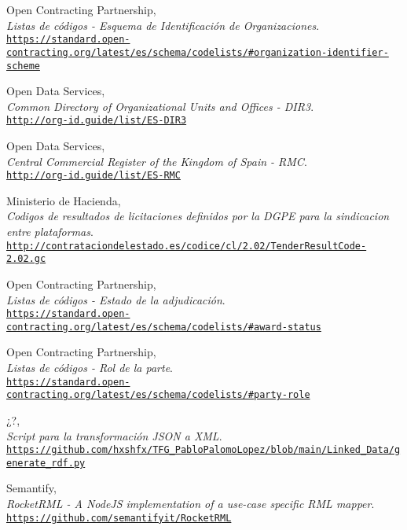 \begin{thebibliography}{X}
            Open Contracting Partnership,
            \\ \textit{Listas de códigos - Esquema de Identificación de Organizaciones}.
            \\ \texttt{\url{https://standard.open-contracting.org/latest/es/schema/codelists/\#organization-identifier-scheme}}
            
            Open Data Services,
            \\ \textit{Common Directory of Organizational Units and Offices - DIR3}.
            \\ \texttt{\url{http://org-id.guide/list/ES-DIR3}}
            
            Open Data Services,
            \\ \textit{Central Commercial Register of the Kingdom of Spain - RMC}.
            \\ \texttt{\url{http://org-id.guide/list/ES-RMC}}
        
            Ministerio de Hacienda,
            \\ \textit{Codigos de resultados de licitaciones definidos por la DGPE para la sindicacion entre plataformas}.
            \\ \texttt{\url{http://contrataciondelestado.es/codice/cl/2.02/TenderResultCode-2.02.gc}}
            
            Open Contracting Partnership,
            \\ \textit{Listas de códigos - Estado de la adjudicación}.
            \\ \texttt{\url{https://standard.open-contracting.org/latest/es/schema/codelists/\#award-status}}
            
            Open Contracting Partnership,
            \\ \textit{Listas de códigos - Rol de la parte}.
            \\ \texttt{\url{https://standard.open-contracting.org/latest/es/schema/codelists/\#party-role}}
        
            ¿?,
            \\ \textit{Script para la transformación JSON a XML}.
            \\ \texttt{\url{https://github.com/hxshfx/TFG_PabloPalomoLopez/blob/main/Linked_Data/generate_rdf.py}}
        
            Semantify,
            \\ \textit{RocketRML - A NodeJS implementation of a use-case specific RML mapper}.
            \\ \texttt{\url{https://github.com/semantifyit/RocketRML}}
            

\end{thebibliography}

